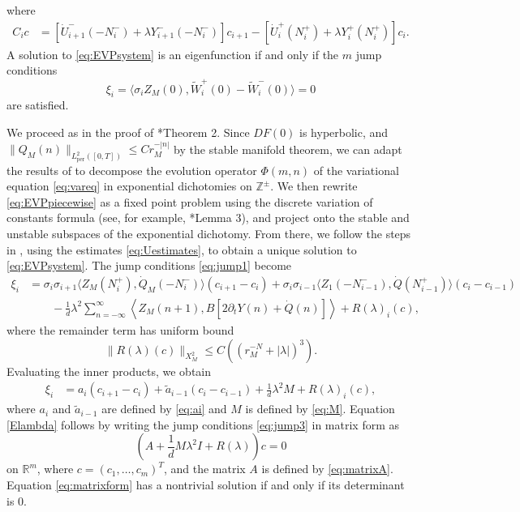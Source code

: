 \documentclass[12pt,reqno]{amsart}
\def\R{{\mathbb R}}
\def\Z{{\mathbb Z}}
\def\per{\textrm{per}}
\theoremstyle{definition}
\begin{document}
where
\begin{equation}
\begin{aligned}
C_i c &= [ \dot{U}_{i+1}^-(-N_i^-) + \lambda Y_{i+1}^-(-N_i^-) ]c_{i+1} 
- [ \dot{U}_i^+(N_i^+) + \lambda Y_i^+(N_i^+) ] c_i.
\end{aligned}
\end{equation}
A solution to \cref{eq:EVPsystem} is an eigenfunction if and only if the $m$ jump conditions
\begin{equation}\label{eq:jump1}
\xi_i = \langle \sigma_i Z_M(0), \tilde{W}_i^+(0) - \tilde{W}_i^-(0) \rangle = 0
\end{equation}
are satisfied.

We proceed as in the proof of \cite{Parker2020}*{Theorem 2}. Since $DF(0)$ is hyperbolic, and $\| Q_M(n) \|_{L^2_\per([0,T])} \leq C r_M^{-|n|}$ by the stable manifold theorem, we can adapt the results of \cite{Palmer1988} to decompose the evolution operator $\Phi(m,n)$ of the variational equation \cref{eq:vareq} in exponential dichotomies on $\Z^\pm$. We then rewrite \cref{eq:EVPpiecewise} as a fixed point problem using the discrete variation of constants formula (see, for example, \cite{Parker2020}*{Lemma 3}), and project onto the stable and unstable subspaces of the exponential dichotomy. From there, we follow the steps in \cite{Parker2020}, using the estimates \cref{eq:Uestimates}, to obtain a unique solution to \cref{eq:EVPsystem}. The jump conditions \cref{eq:jump1} become
\begin{equation}\label{eq:jump2}
\begin{aligned}
\xi_i &= \sigma_i \sigma_{i+1} \langle Z_M(N_i^+), \dot{Q}_M (-N_i^-) \rangle (c_{i+1} - c_i) 
+ \sigma_i\sigma_{i-1} \langle  Z_1(-N_{i-1}^-), \dot{Q}(N_{i-1}^+) \rangle (c_i - c_{i-1}) \\
&\qquad -\frac{1}{d} \lambda^2 \sum_{n=-\infty}^\infty \left\langle Z_M(n+1), B[ 2 \partial_t Y(n) + \dot{Q}(n)]\right\rangle + R(\lambda)_i(c),
\end{aligned}
\end{equation}
where the remainder term has uniform bound
\[
\| R(\lambda)(c)\|_{X_M^2} \leq C \left( (r_M^{-N} + |\lambda|)^3\right).
\]
Evaluating the inner products, we obtain
\begin{equation}\label{eq:jump3}
\begin{aligned}
\xi_i &= a_i (c_{i+1} - c_i) + \tilde{a}_{i-1} (c_i - c_{i-1}) + \frac{1}{d} \lambda^2 M + R(\lambda)_i(c),
\end{aligned}
\end{equation}
where $a_i$ and $\tilde{a}_{i-1}$ are defined by \cref{eq:ai} and $M$ is defined by \cref{eq:M}. Equation \cref{Elambda} follows by writing the jump conditions \cref{eq:jump3} in matrix form as
\begin{equation}\label{eq:matrixform}
\left( A + \frac{1}{d} M \lambda^2 I + R(\lambda) \right) c = 0
\end{equation}
on $\R^m$, where $c = (c_1, \dots, c_m)^T$, and the matrix $A$ is defined by \cref{eq:matrixA}. Equation \cref{eq:matrixform} has a nontrivial solution if and only if its determinant is 0.



\end{document}
